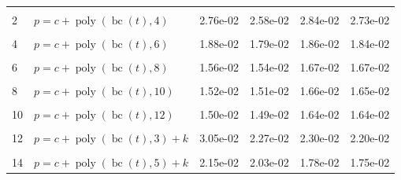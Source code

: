 \documentclass[12pt,a4paper]{article}
\DeclareMathOperator{\bc}{bc}
\DeclareMathOperator{\poly}{poly}
\begin{document}
\begin{longtable}[t]{ll>{\raggedleft\arraybackslash}p{2cm}>{\raggedleft\arraybackslash}p{2cm}>{\raggedleft\arraybackslash}p{2cm}>{\raggedleft\arraybackslash}p{2cm}}
\endfoot
\bottomrule
\endlastfoot
\cellcolor{gray!6}{1} & \cellcolor{gray!6}{$p = c + \poly\left( \bc(t), 3 \right)$} & \cellcolor{gray!6}{3.18e-02} & \cellcolor{gray!6}{2.47e-02} & \cellcolor{gray!6}{2.62e-02} & \cellcolor{gray!6}{2.52e-02}\\
2 & $p = c + \poly\left( \bc(t), 4 \right)$ & 2.76e-02 & 2.58e-02 & 2.84e-02 & 2.73e-02\\
\cellcolor{gray!6}{3} & \cellcolor{gray!6}{$p = c + \poly\left( \bc(t), 5 \right)$} & \cellcolor{gray!6}{2.34e-02} & \cellcolor{gray!6}{2.25e-02} & \cellcolor{gray!6}{2.17e-02} & \cellcolor{gray!6}{2.15e-02}\\
4 & $p = c + \poly\left( \bc(t), 6 \right)$ & 1.88e-02 & 1.79e-02 & 1.86e-02 & 1.84e-02\\
\cellcolor{gray!6}{5} & \cellcolor{gray!6}{$p = c + \poly\left( \bc(t), 7 \right)$} & \cellcolor{gray!6}{1.81e-02} & \cellcolor{gray!6}{1.75e-02} & \cellcolor{gray!6}{1.92e-02} & \cellcolor{gray!6}{1.85e-02}\\
6 & $p = c + \poly\left( \bc(t), 8 \right)$ & 1.56e-02 & 1.54e-02 & 1.67e-02 & 1.67e-02\\
\cellcolor{gray!6}{7} & \cellcolor{gray!6}{$p = c + \poly\left( \bc(t), 9 \right)$} & \cellcolor{gray!6}{1.54e-02} & \cellcolor{gray!6}{1.53e-02} & \cellcolor{gray!6}{1.68e-02} & \cellcolor{gray!6}{1.67e-02}\\
8 & $p = c + \poly\left( \bc(t), 10 \right)$ & 1.52e-02 & 1.51e-02 & 1.66e-02 & 1.65e-02\\
\cellcolor{gray!6}{9} & \cellcolor{gray!6}{$p = c + \poly\left( \bc(t), 11 \right)$} & \cellcolor{gray!6}{1.50e-02} & \cellcolor{gray!6}{1.50e-02} & \cellcolor{gray!6}{1.64e-02} & \cellcolor{gray!6}{1.64e-02}\\
10 & $p = c + \poly\left( \bc(t), 12 \right)$ & 1.50e-02 & 1.49e-02 & 1.64e-02 & 1.64e-02\\
\cellcolor{gray!6}{11} & \cellcolor{gray!6}{$p = c + \poly\left( \bc(t), 13 \right)$} & \cellcolor{gray!6}{1.49e-02} & \cellcolor{gray!6}{1.49e-02} & \cellcolor{gray!6}{1.64e-02} & \cellcolor{gray!6}{1.64e-02}\\
12 & $p = c + \poly\left( \bc(t), 3 \right) + k$ & 3.05e-02 & 2.27e-02 & 2.30e-02 & 2.20e-02\\
\cellcolor{gray!6}{13} & \cellcolor{gray!6}{$p = c + \poly\left( \bc(t), 4 \right) + k$} & \cellcolor{gray!6}{2.60e-02} & \cellcolor{gray!6}{2.40e-02} & \cellcolor{gray!6}{2.56e-02} & \cellcolor{gray!6}{2.44e-02}\\
14 & $p = c + \poly\left( \bc(t), 5 \right) + k$ & 2.15e-02 & 2.03e-02 & 1.78e-02 & 1.75e-02\\

\end{longtable}
\end{document}
